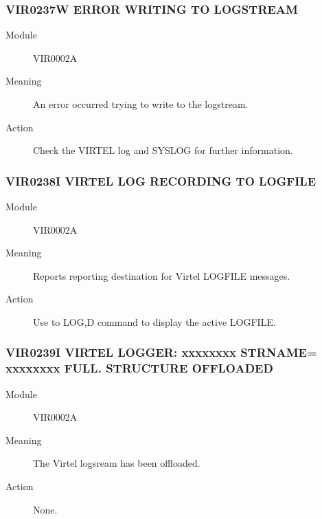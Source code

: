 \documentclass[letterpaper,10pt,english]{sphinxmanual}
\begin{document}
\subsubsection{VIR0237W ERROR WRITING TO LOGSTREAM}
\label{\detokenize{messages:vir0237w-error-writing-to-logstream}}\begin{description}
\item[{Module}] \leavevmode
VIR0002A

\item[{Meaning}] \leavevmode
An error occurred trying to write to the logstream.

\item[{Action}] \leavevmode
Check the VIRTEL log and SYSLOG for further information.

\end{description}


\subsubsection{VIR0238I VIRTEL LOG RECORDING TO LOGFILE}
\label{\detokenize{messages:vir0238i-virtel-log-recording-to-logfile}}\begin{description}
\item[{Module}] \leavevmode
VIR0002A

\item[{Meaning}] \leavevmode
Reports reporting destination for Virtel LOGFILE messages.

\item[{Action}] \leavevmode
Use to LOG,D command to display the active LOGFILE.

\end{description}


\subsubsection{VIR0239I VIRTEL LOGGER: xxxxxxxx STRNAME= xxxxxxxx FULL. STRUCTURE OFFLOADED}
\label{\detokenize{messages:vir0239i-virtel-logger-xxxxxxxx-strname-xxxxxxxx-full-structure-offloaded}}\begin{description}
\item[{Module}] \leavevmode
VIR0002A

\item[{Meaning}] \leavevmode
The Virtel logsream has been offloaded.

\item[{Action}] \leavevmode
None.

\end{description}
\end{document}
